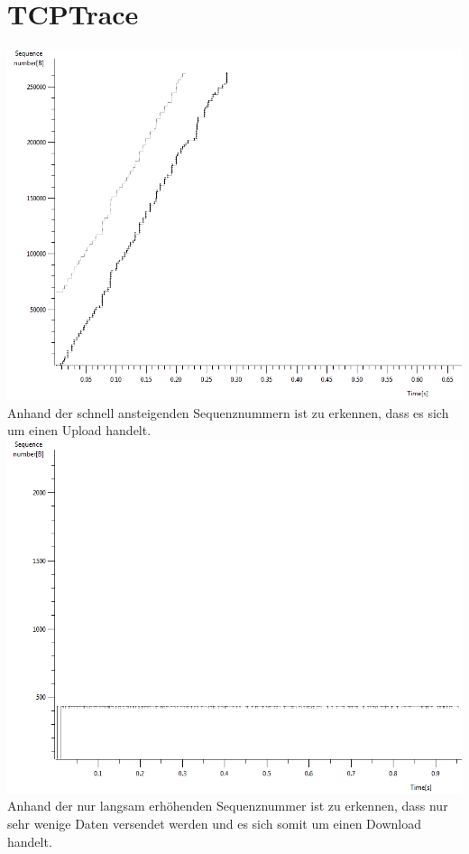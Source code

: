 \section{TCPTrace}
\includegraphics[scale=0.5]{media/tcptraceUpload.png}\\
Anhand der schnell ansteigenden Sequenznummern ist zu erkennen, dass es sich um einen Upload handelt.\\
\includegraphics[scale=0.5]{media/tcptraceDownload.png}\\
Anhand der nur langsam erhöhenden Sequenznummer ist zu erkennen, dass nur sehr wenige Daten versendet werden und es sich somit um einen Download handelt.

